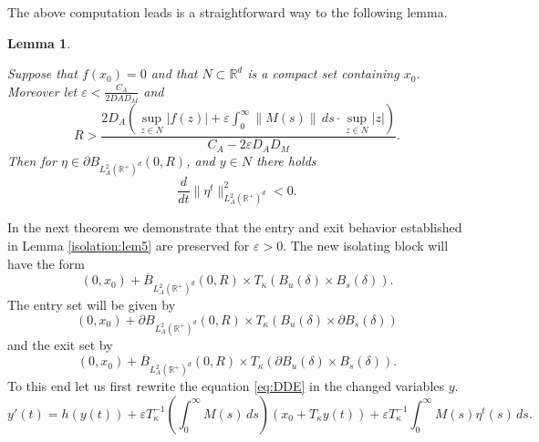 \documentclass[11pt, leqno]{amsart}
\newtheorem{lem}[thm]{Lemma}
\theoremstyle{definition}
\def\R{\mathbb{R}}
\begin{document}
The above computation leads is a straightforward way to the following lemma.
\begin{lem}
\label{lem:iso-tail-pz}

Suppose that
$f(x_0) = 0$ and that $N \subset \mathbb{R}^d$ is a compact set containing $x_0$. Moreover let
 $\varepsilon < \frac{C_A}{2DAD_M}$ and
$$
R > \frac{2 D_A  \left(\sup_{z\in N}|f(z)|+  \varepsilon  \int_{0}^\infty \|M(s)\|\, ds  \cdot \sup_{z\in N}|z|  \right) }{C_A-2\varepsilon D_AD_M}.
$$
Then for $\eta \in \partial B_{L^2_A(\R^+)^d}(0,R)$, and $y\in N$ there holds
$$\frac{d}{dt} \|\eta^t\|^2_{L^2_A(\R^+)^d} < 0.
$$
\end{lem}

In the next theorem we demonstrate that the entry and exit behavior established in Lemma \ref{isolation:lem5} are preserved for $\varepsilon>0$. The new isolating block will have the form $$(0,x_0)+\overline{B}_{L^2_A(\R^+)^d}(0,R)\times T_\kappa(B_u(\delta)\times B_s(\delta)).$$
The entry set will be given by
$$(0,x_0)+\partial {B}_{L^2_A(\R^+)^d}(0,R)\times T_\kappa(B_u(\delta)\times \partial B_s(\delta))$$
and the exit set by
$$(0,x_0)+\overline{B}_{L^2_A(\R^+)^d}(0,R)\times T_\kappa(\partial B_u(\delta)\times B_s(\delta)).$$
To this end let us first rewrite the equation \eqref{eq:DDE} in the changed variables $y$.
$$
y'(t) = h(y(t)) + \varepsilon T_{\kappa}^{-1} \left(\int_0^\infty M(s)\, ds\right) (x_0+T_\kappa y(t)) + \varepsilon T_\kappa^{-1}\int_0^\infty M(s) \eta^t(s)\, ds.
$$
\end{document}
